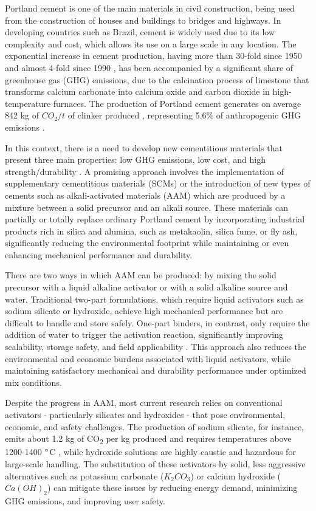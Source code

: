 Portland cement is one of the main materials in civil construction, being used from the construction of houses and buildings to bridges and highways.
In developing countries such as Brazil, cement is widely used due to its low complexity and cost, which allows its use on a large scale in any location.
The exponential increase in cement production, having more than 30-fold since 1950 and almost 4-fold since 1990 \cite{usgs2016cement}, has been accompanied by a significant share of greenhouse gas (GHG) emissions, due to the calcination process of limestone that transforms calcium carbonate into calcium oxide and carbon dioxide in high-temperature furnaces.
The production of Portland cement generates on average 842 kg of $CO_2/t$ of clinker produced \cite{andrew2018global}, representing 5.6\% of anthropogenic GHG emissions \cite{le2018global}.

In this context, there is a need to develop new cementitious materials that present three main properties: low GHG emissions, low cost, and high strength/durability \cite{scrivener2018eco}.
A promising approach involves the implementation of supplementary cementitious materials (SCMs) or the introduction of new types of cements such as alkali-activated materials (AAM) which are produced by a mixture between a solid precursor and an alkali source.
These materials can partially or totally replace ordinary Portland cement by incorporating industrial products rich in silica and alumina, such as metakaolin, silica fume, or fly ash, significantly reducing the environmental footprint while maintaining or even enhancing mechanical performance and durability.

There are two ways in which AAM can be produced: by mixing the solid precursor with a liquid alkaline activator or with a solid alkaline source and water.
Traditional two-part formulations, which require liquid activators such as sodium silicate or hydroxide, achieve high mechanical performance but are difficult to handle and store safely.
One-part binders, in contrast, only require the addition of water to trigger the activation reaction, significantly improving scalability, storage safety, and field applicability \cite{provis2018alkali}.
This approach also reduces the environmental and economic burdens associated with liquid activators, while maintaining satisfactory mechanical and durability performance under optimized mix conditions.

Despite the progress in AAM, most current research relies on conventional activators - particularly silicates and hydroxides \cite{zareechian2023advancements} - that pose environmental, economic, and safety challenges.
The production of sodium silicate, for instance, emits about 1.2 kg of CO\textsubscript{2} per kg produced \cite{neupane2022evaluation} and requires temperatures above 1200-1400 $^{\circ}$C \cite{vinai2019production}, while hydroxide solutions are highly caustic and hazardous for large-scale handling.
The substitution of these activators by solid, less aggressive alternatives such as potassium carbonate ($K_2CO_3$) or calcium hydroxide ($Ca(OH)_2$) can mitigate these issues by reducing energy demand, minimizing GHG emissions, and improving user safety.

